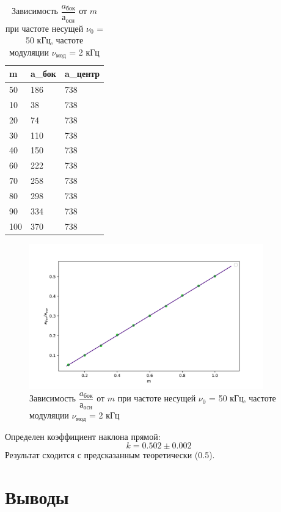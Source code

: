 \documentclass[a4paper,12pt]{article} %
\begin{document}
\begin{table}[h!]
\caption{Зависимость $\dfrac{a_{бок}}{а_{осн}}$ от $m$ при частоте несущей $\nu_0$ = 50 кГц, частоте модуляции $\nu_{мод}$ = 2 кГц}
\label{mod_tbl}
\begin{tabular}{|l|l|l|}
\hline
m   & a\_бок & a\_центр \\ \hline
50  & 186    & 738      \\ \hline
10  & 38     & 738      \\ \hline
20  & 74     & 738      \\ \hline
30  & 110    & 738      \\ \hline
40  & 150    & 738      \\ \hline
60  & 222    & 738      \\ \hline
70  & 258    & 738      \\ \hline
80  & 298    & 738      \\ \hline
90  & 334    & 738      \\ \hline
100 & 370    & 738      \\ \hline
\end{tabular}
\end{table}
\begin{figure}[h!]
\begin{center}
\includegraphics[width=0.9\textwidth]{a(m)}
\caption{Зависимость $\dfrac{a_{бок}}{а_{осн}}$ от $m$ при частоте несущей $\nu_0$ = 50 кГц, частоте модуляции $\nu_{мод}$ = 2 кГц} \label{mod_img}
\end{center}
\end{figure}
Определен коэффициент наклона прямой:
\begin{equation}
k = 0.502 \pm 0.002
\end{equation} 
Результат сходится с предсказанным теоретически (0.5).

\section{Выводы}
\end{document}
